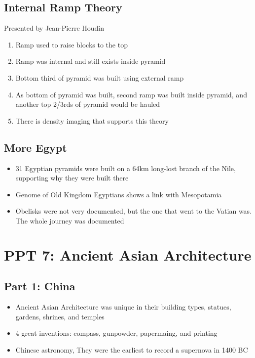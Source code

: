 \documentclass{article}
\begin{document}
\subsection{Internal Ramp Theory}
Presented by Jean-Pierre Houdin
\begin{enumerate}
  \item Ramp used to raise blocks to the top
  \item Ramp was internal and still exists inside pyramid
  \item Bottom third of pyramid was built using external ramp
  \item As bottom of pyramid was built, second ramp was built inside pyramid, and another
    top 2/3rds of pyramid would be hauled
  \item There is density imaging that supports this theory
\end{enumerate}

\subsection{More Egypt}
\begin{itemize}
  \item 31 Egyptian pyramids were built on a 64km
    long-lost branch of the Nile, supporting why they were built there
  \item Genome of Old Kingdom Egyptians shows a link
    with Mesopotamia
  \item Obelisks were not very documented, but the one that
    went to the Vatian was. The whole journey was documented
\end{itemize}

\section{PPT 7: Ancient Asian Architecture}
\subsection{Part 1: China}
\begin{itemize}
  \item Ancient Asian Architecture was unique in their
    building types, statues, gardens, shrines, and temples
  \item 4 great inventions: compass, gunpowder, papermaing, and printing
  \item Chinese astronomy, They were the earliest to record a supernova in 1400 BC
\end{itemize}
\end{document}
